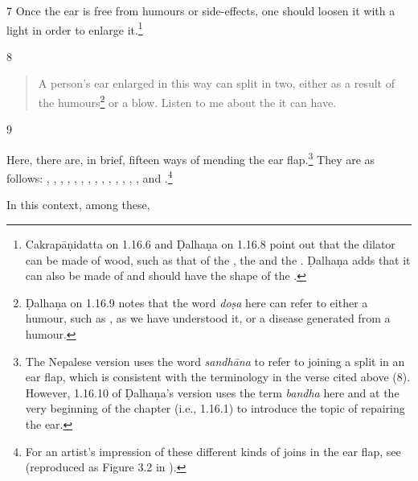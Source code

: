 \begin{translation}
    \item[7]
    Once the ear is free from humours or side-effects, one should 
    loosen it with a light  in order to enlarge it.\footnote{Cakrapāṇidatta on 1.16.6 \citep[127]{acar-1939} and Ḍalhaṇa on 1.16.8 \citep[77]{vulgate} point out that the dilator can be made of wood, such as that of the , the  and the . Ḍalhaṇa adds that it can also be made of  and should have the shape of the .}
    
    \item[8]
    
    \begin{verse}

A person's ear enlarged in this way can split in two, either as a result of the humours\footnote{Ḍalhaṇa on 1.16.9  \citep[77]{vulgate} notes that the word \emph{doṣa} here can refer to either a humour, such as , as we have understood it, or a disease generated from a humour.} or a blow. Listen to me about the  it can have.
        
    \end{verse}
    
        \item[9]
    
Here, there are, in brief, fifteen ways of mending the ear flap.\footnote{The Nepalese version uses the word \emph{sandhāna} to refer to joining a split in an ear flap, which is consistent with the terminology in the verse cited above (8). However, 1.16.10 of Ḍalhaṇa's version \citep[77]{vulgate} uses the term \emph{bandha} here and at the very beginning of the chapter (i.e., 1.16.1) to introduce the topic of repairing the ear.}  They are as follows:
    , , , , , , , , , , 
    , ,
    , , and .\footnote{For an artist's impression of these different kinds of joins in the ear flap, see \cite[290]{majn-1975} (reproduced as Figure 3.2 in \cite[154]{wuja-2003}).}
    
    In this context, among these, 
    \begin{description}
        

\end{description}
\end{translation}
